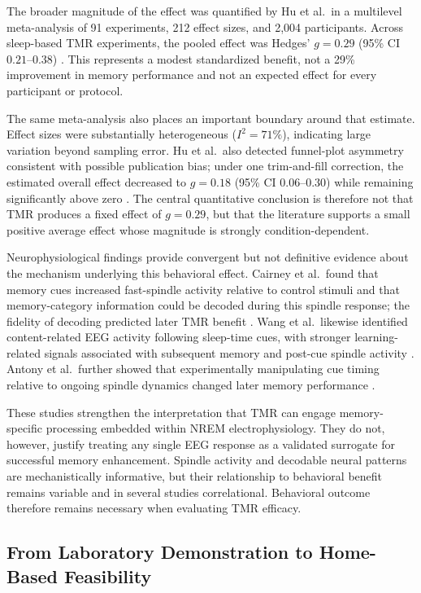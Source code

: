 The broader magnitude of the effect was quantified by Hu et al.\ in a multilevel
meta-analysis of 91 experiments, 212 effect sizes, and 2,004 participants.
Across sleep-based TMR experiments, the pooled effect was
Hedges' \(g=0.29\) (95\% CI \(0.21\)--\(0.38\))
\citep{hu2020promoting}. This represents a modest standardized benefit, not a
29\% improvement in memory performance and not an expected effect for every
participant or protocol.

The same meta-analysis also places an important boundary around that estimate.
Effect sizes were substantially heterogeneous
(\(I^2=71\%\)), indicating large variation beyond sampling error. Hu et al.\
also detected funnel-plot asymmetry consistent with possible publication bias;
under one trim-and-fill correction, the estimated overall effect decreased to
\(g=0.18\) (95\% CI \(0.06\)--\(0.30\)) while remaining significantly above
zero \citep{hu2020promoting}. The central quantitative conclusion is therefore
not that TMR produces a fixed effect of \(g=0.29\), but that the literature
supports a small positive average effect whose magnitude is strongly
condition-dependent.

Neurophysiological findings provide convergent but not definitive evidence about
the mechanism underlying this behavioral effect. Cairney et al.\ found that
memory cues increased fast-spindle activity relative to control stimuli and
that memory-category information could be decoded during this spindle response;
the fidelity of decoding predicted later TMR benefit
\citep{cairney2018spindle}. Wang et al.\ likewise identified
content-related EEG activity following sleep-time cues, with stronger
learning-related signals associated with subsequent memory and post-cue spindle
activity \citep{wang2019signals}. Antony et al.\ further showed that
experimentally manipulating cue timing relative to ongoing spindle dynamics
changed later memory performance \citep{antony2018spindle}.

These studies strengthen the interpretation that TMR can engage
memory-specific processing embedded within NREM electrophysiology. They do not,
however, justify treating any single EEG response as a validated surrogate for
successful memory enhancement. Spindle activity and decodable neural patterns
are mechanistically informative, but their relationship to behavioral benefit
remains variable and in several studies correlational. Behavioral outcome
therefore remains necessary when evaluating TMR efficacy.


\subsection{From Laboratory Demonstration to Home-Based Feasibility}

